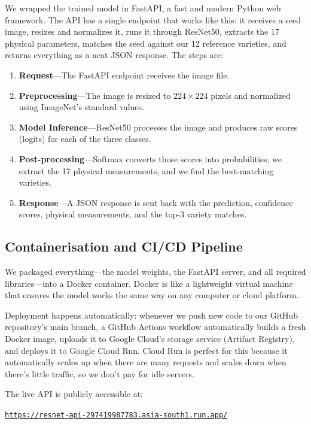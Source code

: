 We wrapped the trained model in FastAPI, a fast and modern Python web framework. The API has a single endpoint that works like this: it receives a seed image, resizes and normalizes it, runs it through ResNet50, extracts the 17 physical parameters, matches the seed against our 12 reference varieties, and returns everything as a neat JSON response. The steps are:

\begin{enumerate}
    \item \textbf{Request}---The FastAPI endpoint receives the image file.
    \item \textbf{Preprocessing}---The image is resized to $224 \times 224$ pixels and normalized using ImageNet's standard values.
    \item \textbf{Model Inference}---ResNet50 processes the image and produces raw scores (logits) for each of the three classes.
    \item \textbf{Post-processing}---Softmax converts those scores into probabilities, we extract the 17 physical measurements, and we find the best-matching varieties.
    \item \textbf{Response}---A JSON response is sent back with the prediction, confidence scores, physical measurements, and the top-3 variety matches.
\end{enumerate}

\subsection{Containerisation and CI/CD Pipeline}

We packaged everything—the model weights, the FastAPI server, and all required libraries—into a Docker container. Docker is like a lightweight virtual machine that ensures the model works the same way on any computer or cloud platform.

Deployment happens automatically: whenever we push new code to our GitHub repository's main branch, a GitHub Actions workflow automatically builds a fresh Docker image, uploads it to Google Cloud's storage service (Artifact Registry), and deploys it to Google Cloud Run. Cloud Run is perfect for this because it automatically scales up when there are many requests and scales down when there's little traffic, so we don't pay for idle servers.

The live API is publicly accessible at:
\begin{center}
\href{https://resnet-api-297419987783.asia-south1.run.app/}{\nolinkurl{https://resnet-api-297419987783.asia-south1.run.app/}}
\end{center}

